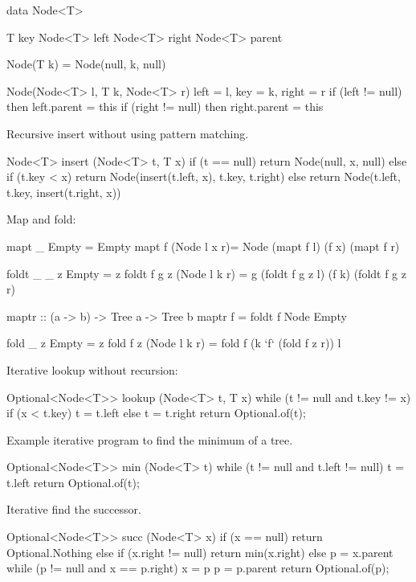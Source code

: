 \documentclass[b5paper]{article}
\begin{document}
\lstset{frame=single}
\begin{Bourbaki}
data Node<T> {
    T key
    Node<T> left
    Node<T> right
    Node<T> parent

    Node(T k) = Node(null, k, null)

    Node(Node<T> l, T k, Node<T> r) {
        left = l, key = k, right = r
        if (left != null) then left.parent = this
        if (right != null) then right.parent = this
    }
}
\end{Bourbaki}

Recursive insert without using pattern matching.

\begin{Bourbaki}
Node<T> insert (Node<T> t, T x) {
    if (t == null) {
        return Node(null, x, null)
    } else if (t.key < x) {
        return Node(insert(t.left, x), t.key, t.right)
    } else {
        return Node(t.left, t.key, insert(t.right, x))
    }
}
\end{Bourbaki}

Map and fold:

\begin{Haskell}
mapt _ Empty = Empty
mapt f (Node l x r)= Node (mapt f l) (f x) (mapt f r)

foldt _ _ z Empty = z
foldt f g z (Node l k r) = g (foldt f g z l) (f k) (foldt f g z r)

maptr :: (a -> b) -> Tree a -> Tree b
maptr f = foldt f Node Empty

fold _ z Empty = z
fold f z (Node l k r) = fold f (k `f` (fold f z r)) l
\end{Haskell}

Iterative lookup without recursion:

\begin{Bourbaki}
Optional<Node<T>> lookup (Node<T> t, T x) {
    while (t != null and t.key != x) {
        if (x < t.key) {
            t = t.left
        } else {
            t = t.right
        }
    }
    return Optional.of(t);
}
\end{Bourbaki}

Example iterative program to find the minimum of a tree.

\begin{Bourbaki}
Optional<Node<T>> min (Node<T> t) {
    while (t != null and t.left != null) {
        t = t.left
    }
    return Optional.of(t);
}
\end{Bourbaki}

Iterative find the successor.

\begin{Bourbaki}
Optional<Node<T>> succ (Node<T> x) {
    if (x == null) {
        return Optional.Nothing
    } else if (x.right != null) {
        return min(x.right)
    } else {
        p = x.parent
        while (p != null and x == p.right) {
            x = p
            p = p.parent
        }
        return Optional.of(p);
    }
}
\end{Bourbaki}
\end{document}
